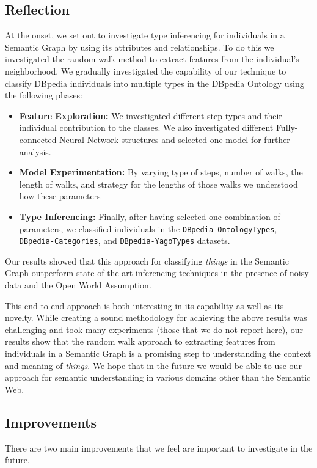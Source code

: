 \documentclass[runningheads,a4paper]{IEEEtran}
\begin{document}
\subsection{Reflection}
At the onset, we set out to investigate type inferencing for individuals in a Semantic Graph by using its attributes and relationships. To do this we investigated the random walk method to extract features from the individual's neighborhood. We gradually investigated the capability of our technique to classify DBpedia individuals into multiple types in the DBpedia Ontology using the following phases: 
\begin{itemize}
\item \textbf{Feature Exploration:} We investigated different step types and their individual contribution to the classes. We also investigated different Fully-connected Neural Network structures and selected one model for further analysis.
\item \textbf{Model Experimentation:} By varying type of steps, number of walks, the length of walks, and strategy for the lengths of those walks we understood how these parameters 
\item \textbf{Type Inferencing:} Finally, after having selected one combination of parameters, we classified individuals in the \texttt{DBpedia-OntologyTypes}, \texttt{DBpedia-Categories}, and \texttt{DBpedia-YagoTypes}  datasets. 
\end{itemize}
Our results showed that this approach for classifying \textit{things} in the Semantic Graph outperform state-of-the-art inferencing techniques in the presence of noisy data and the Open World Assumption.

This end-to-end approach is both interesting in its capability as well as its novelty. While creating a sound methodology for achieving the above results was challenging and took many experiments (those that we do not report here), our results show that the random walk approach to extracting features from individuals in a Semantic Graph is a promising step to understanding the context and meaning of \textit{things}. We hope that in the future we would be able to use our approach for semantic understanding in various domains other than the Semantic Web.

\subsection{Improvements}
There are two main improvements that we feel are important to investigate in the future. 
\end{document}
